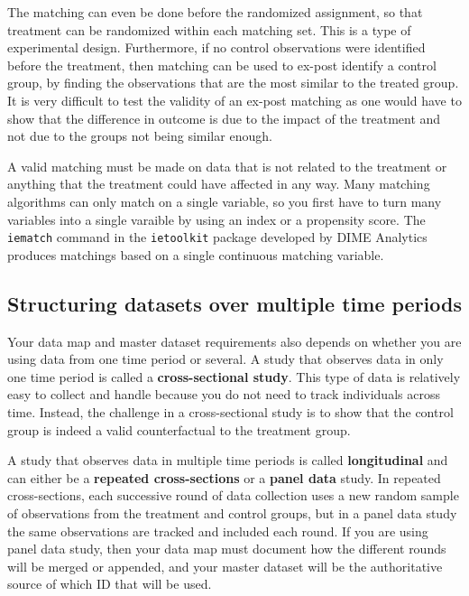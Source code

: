 The matching can even be done before the randomized assignment,
so that treatment can be randomized within each matching set.
This is a type of experimental design.
Furthermore, if no control observations were identified before the treatment,
then matching can be used to ex-post identify a control group,
by finding the observations that are the most similar to the treated group.
It is very difficult to test the validity of an ex-post matching
as one would have to show that the difference in outcome is
due to the impact of the treatment and not due to the groups not being similar enough.

A valid matching must be made on data that is not related to the treatment
or anything that the treatment could have affected in any way.
Many matching algorithms can only match on a single variable,
so you first have to turn many variables into a single varaible
by using an index or a propensity score.
The \texttt{iematch}
command in the \texttt{ietoolkit} package developed by DIME Analytics
produces matchings based on a single continuous matching variable.

\subsection{Structuring datasets over multiple time periods}

Your data map and master dataset requirements also depends on
whether you are using data from one time period or several.
A study that observes data in only one time period is called
a \textbf{cross-sectional study}.
This type of data is relatively easy to collect and handle because
you do not need to track individuals across time.
Instead, the challenge in a cross-sectional study is to
show that the control group is indeed a valid counterfactual to the treatment group.

A study that observes data in multiple time periods is called \textbf{longitudinal}
and can either be a \textbf{repeated cross-sections}
or a \textbf{panel data} study. 
In repeated cross-sections,
each successive round of data collection uses a new random sample
of observations from the treatment and control groups,
but in a panel data study the same observations are tracked and included each round.
If you are using panel data study,
then your data map must document how the different rounds will be merged or appended,
and your master dataset will be the authoritative source of which ID that will be used. 


